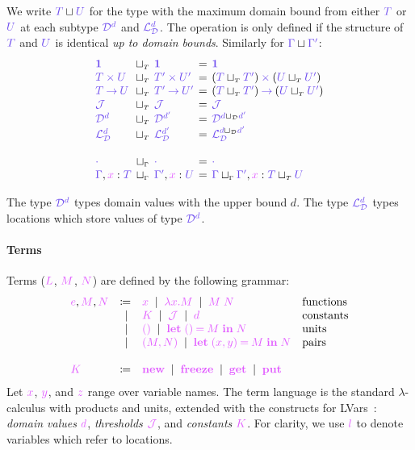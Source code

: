 \documentclass[main.tex]{subfiles}
\begin{document}
We write $\ty{T}\sqcup\ty{U}$ for the type with the maximum domain bound from either $\ty{T}$ or $\ty{U}$ at each subtype $\tyD{d}$ and $\tyL{d}$. The operation is only defined if the structure of $\ty{T}$ and $\ty{U}$ is identical \emph{up to domain bounds}. Similarly for $\ty{\Gamma}\sqcup\ty{\Gamma'}$:
\[
  \setlength{\arraycolsep}{2pt}
  \begin{array}{lclcl}
    \ty{\tyunit} & \sqcupT & \ty{\tyunit}
    & = & \ty{\tyunit}
    \\
    \ty{\typrod{T}{U}} & \sqcupT & \ty{\typrod{T'}{U'}}
    & = & \typrod{(\ty{T}\sqcupT\ty{T'})}{(\ty{U}\sqcupT\ty{U'})}
    \\
    \ty{\tyfun{T}{U}} & \sqcupT & \ty{\tyfun{T'}{U'}}
    & = & \tyfun{(\ty{T}\sqcupT\ty{T'})}{(\ty{U}\sqcupT\ty{U'})}
    \\
    \tyJ & \sqcupT & \tyJ
    & = & \tyJ
    \\
    \tyD{d} & \sqcupT & \tyD{d'}
    & = & \tyD{{d}\sqcupD{d'}}
    \\
    \tyL{d} & \sqcupT & \tyL{d'}
    & = & \tyL{{d}\sqcupD{d'}}
    \\
    \\
    \ty{\emptyenv} & \sqcupG & \ty{\emptyenv}
    & = & \ty{\emptyenv}
    \\
    \ty{\Gamma},\tmty{x}{T} & \sqcupG & \ty{\Gamma'},\tmty{x}{U}
    & = & \ty{\Gamma}\sqcupG\ty{\Gamma'},\tm{x}:{\ty{T}\sqcupT\ty{U}}
  \end{array}
\]

The type $\tyD{d}$ types domain values with the upper bound $d$. The type $\tyL{d}$ types locations which store values of type $\tyD{d}$.

\paragraph*{Terms}
Terms ($\tm{L}$, $\tm{M}$, $\tm{N}$) are defined by the following grammar:
\[
  \begin{array}{lrll}
  \tm{e}, \tm{M}, \tm{N}
  & \coloneqq & \tm{x}
    \sep        \tm{\lambda x.M}
    \sep        \tm{M\;N}                     & \text{functions} \\
  & \sep      & \tm{K}                        
    \sep        \tmJ
    \sep        \tm{d}                        & \text{constants} \\
  & \sep      & \tm{\unit}                    
    \sep        \tm{\letunit{M}{N}}           & \text{units} \\
  & \sep      & \tm{\pair{M}{N}}              
    \sep        \tm{\letpair{x}{y}{M}{N}}     & \text{pairs}
  \\
  \\
  \tm{K}
  & \coloneqq & \tm{\lvarnew}
    \sep        \tm{\lvarfreeze}
    \sep        \tm{\lvarget}
    \sep        \tm{\lvarput}
\end{array}
\]
Let $\tm{x}$, $\tm{y}$, and $\tm{z}$ range over variable names. The term language is the standard $\lambda$-calculus with products and units, extended with the constructs for LVars~\citep{kuper15}: \emph{domain values} $\tm{d}$, \emph{thresholds} $\tmJ$, and \emph{constants} $\tm{K}$. For clarity, we use $\tm{l}$ to denote variables which refer to locations. 
\end{document}
